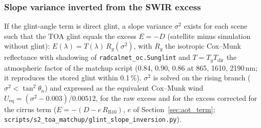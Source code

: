 \documentclass[11pt,a4paper]{article}
\newcommand{\code}[1]{\texttt{#1}}
\begin{document}
\subsubsection{Slope variance inverted from the SWIR excess}
\label{sec:glint_inv}
If the glint-angle term is direct glint, a slope variance $\sigma^2$ exists for each scene such that the TOA glint
equals the excess $E = -D$ (satellite minus simulation without glint): $E(\lambda) = T(\lambda)\,R_g(\sigma^2)$,
with $R_g$ the isotropic Cox--Munk reflectance with shadowing of \code{radcalnet\_oc.Sunglint} and $T = T_g T_\mathrm{dir}$
the atmospheric factor of the matchup script (0.84, 0.90, 0.86 at 865, 1610, 2190\,nm; it reproduces the stored
glint within 0.1\,\%). $\sigma^2$ is solved on the rising branch ($\sigma^2 < \tan^2\theta_n$) and expressed as the
equivalent Cox--Munk wind $U_\mathrm{eq} = (\sigma^2-0.003)/0.00512$, for the raw excess and for the excess
corrected for the cirrus term ($E = -(D - e\,R_\mathrm{B10})$, $e$ of Section~\ref{sec:aot_term};
\code{scripts/s2\_toa\_matchup/glint\_slope\_inversion.py}).
\end{document}
